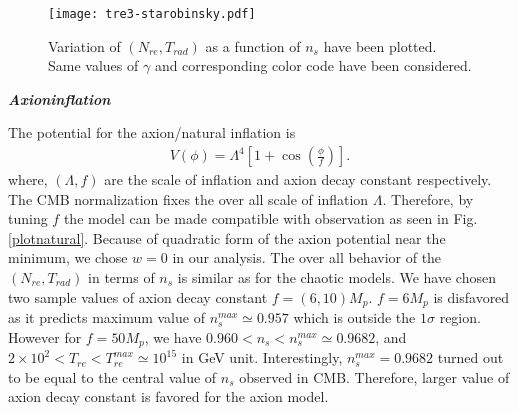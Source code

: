 \documentclass[prl,twocolumn,superscriptaddress,doublespace]{revtex4}%
\def\bea{\begin{eqnarray}}
\def\eea{\end{eqnarray}}
\begin{document}
{  \begin{figure}[t!]
  	\begin{center}
  		\texttt{[image: tre3-starobinsky.pdf]}
  		\caption{\scriptsize Variation of $(N_{re},T_{rad})$ as a function of $n_s$ have been plotted. Same values of $\gamma$ and corresponding color code have been considered.} 
  		\label{plotstarobinsky}
  	\end{center}
  \end{figure} 
  
 \vskip 0.2cm
\textbf {\textit {Axion}}\cite{axion}\textbf{\textit{inflation}}

The potential for the axion/natural inflation is 
\bea
V(\phi)=  \Lambda^4 \left[1 + \cos\left(\frac{\phi}{f}\right) \right] .
\eea
where, $(\Lambda,f)$ are the scale of inflation and axion decay constant respectively. The CMB normalization fixes the over all scale of inflation $\Lambda$. Therefore, by tuning $f$ the model can be made compatible with observation as seen in Fig.\ref{plotnatural}. Because of quadratic form of the axion potential near the minimum, we chose $w = 0$ in our analysis. The over all behavior of the $(N_{re}, T_{rad})$ in terms of $n_s$ is similar as for the chaotic models. We have chosen two sample values of axion decay constant $f=(6,10) M_p$. $f=6 M_p$ is disfavored as it predicts maximum value of $n_s^{max}\simeq 0.957$ which is outside the $1\sigma$ region. However for $f =50 M_p$, we have $0.960 < n_s < n_s^{max}\simeq 0.9682$, and $ 2\times 10^2 < T_{re} < T_{re}^{max} \simeq 10^{15} $ in GeV unit. Interestingly, $n_s^{max} = 0.9682$ turned out to be equal to the central value of $n_s$ observed in CMB. 
Therefore, larger value of axion decay constant is favored for the axion model. 


}
\end{document}
